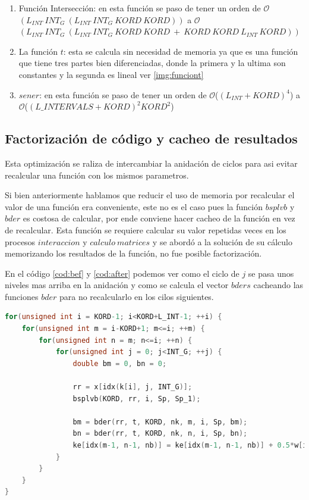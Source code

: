 \documentclass[a4paper,openright,12pt, oneside]{book}
\DeclareRobustCommand{\orderof}{\ensuremath{\mathcal{O}}}
\begin{document}
\begin{enumerate}   
    \item Funci\'on Intersecci\'on: en esta funci\'on se paso de tener un orden de \orderof{$(L_{INT}\ INT_G\ (L_{INT}\ INT_G\ KORD\ KORD))$} a 
     \orderof{$(L_{INT}\ INT_G\ (L_{INT}\ INT_G\ KORD\ KORD\ +\ KORD\ KORD\ L_{INT}\ KORD))$}
    \item La funci\'on $t$: esta se calcula sin necesidad de memoria ya que es una funci\'on que tiene tres partes bien diferenciadas, donde la primera y la ultima son constantes y la segunda es lineal ver \ref{img:funciont}
    \item $sener$: en esta funci\'on se paso de tener un orden de \orderof(${(L_{INT} + KORD)^4}$) a \orderof(${(L\_INTERVALS + KORD)^2 KORD^2}$)
\end{enumerate}



\subsection{Factorizaci\'on de c\'odigo y cacheo de resultados}
Esta optimizaci\'on se raliza de intercambiar la anidaci\'on de ciclos para asi evitar recalcular una funci\'on con los mismos parametros.

Si bien anteriormente hablamos que reducir el uso de memoria por recalcular el valor de una funci\'on era conveniente, este no es el caso pues la funci\'on $bsplvb$ y $bder$ es costosa de calcular, por ende conviene hacer cacheo de la funci\'on en vez de recalcular.
Esta funci\'on se requiere calcular su valor repetidas veces en los procesos $interaccion$ y $calculo\ matrices$ y se abord\'o a la soluci\'on de su c\'alculo memorizando los resultados de la funci\'on, no fue posible factorizaci\'on.

En el c\'odigo \ref{cod:bef} y \ref{cod:after} podemos ver como el ciclo de $j$ se pasa unos niveles mas arriba en la anidaci\'on y como se calcula el vector $bders$ cacheando las funciones $bder$ para no recalcularlo en los cilos siguientes.

\begin{lstlisting}[language=C, caption={Antes de la factorizaci\'on en calculo matrices}, 
label=cod:bef]
for(unsigned int i = KORD-1; i<KORD+L_INT-1; ++i) {
    for(unsigned int m = i-KORD+1; m<=i; ++m) {
        for(unsigned int n = m; n<=i; ++n) {
            for(unsigned int j = 0; j<INT_G; ++j) {
                double bm = 0, bn = 0;

                rr = x[idx(k[i], j, INT_G)];
                bsplvb(KORD, rr, i, Sp, Sp_1);

                bm = bder(rr, t, KORD, nk, m, i, Sp, bm);
                bn = bder(rr, t, KORD, nk, n, i, Sp, bn);
                ke[idx(m-1, n-1, nb)] = ke[idx(m-1, n-1, nb)] + 0.5*w[idx(k[i], j, INT_G)]*bm*bn/me;
            }
        }
    }
}
\end{lstlisting}
\end{document}
